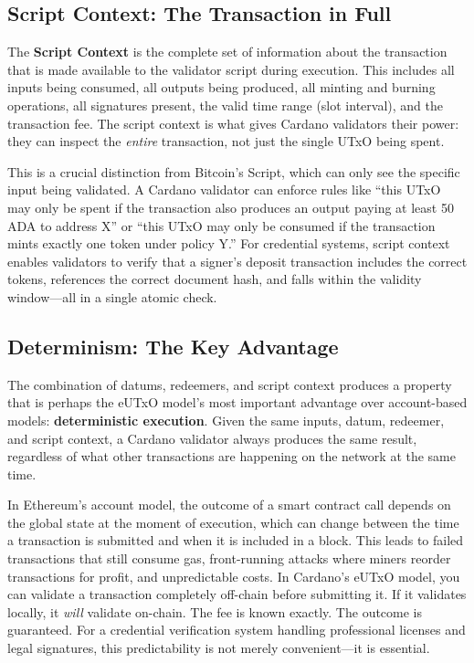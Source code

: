 \subsection{Script Context: The Transaction in Full}

The \textbf{Script Context} is the complete set of information about the
transaction that is made available to the validator script during
execution. This includes all inputs being consumed, all outputs being
produced, all minting and burning operations, all signatures present,
the valid time range (slot interval), and the transaction fee. The script
context is what gives Cardano validators their power: they can inspect
the \emph{entire} transaction, not just the single UTxO being spent.

This is a crucial distinction from Bitcoin's Script, which can only see
the specific input being validated. A Cardano validator can enforce rules
like ``this UTxO may only be spent if the transaction also produces an
output paying at least 50 ADA to address X'' or ``this UTxO may only be
consumed if the transaction mints exactly one token under policy Y.''
For credential systems, script context enables validators to verify that
a signer's deposit transaction includes the correct tokens, references
the correct document hash, and falls within the validity window---all in
a single atomic check.

\subsection{Determinism: The Key Advantage}

The combination of datums, redeemers, and script context produces a
property that is perhaps the eUTxO model's most important advantage over
account-based models: \textbf{deterministic execution}. Given the same
inputs, datum, redeemer, and script context, a Cardano validator always
produces the same result, regardless of what other transactions are
happening on the network at the same time.

In Ethereum's account model, the outcome of a smart contract call
depends on the global state at the moment of execution, which can change
between the time a transaction is submitted and when it is included in a
block. This leads to failed transactions that still consume gas,
front-running attacks where miners reorder transactions for profit, and
unpredictable costs. In Cardano's eUTxO model, you can validate a
transaction completely off-chain before submitting it. If it validates
locally, it \emph{will} validate on-chain. The fee is known exactly. The
outcome is guaranteed. For a credential verification system handling
professional licenses and legal signatures, this predictability is not
merely convenient---it is essential.

